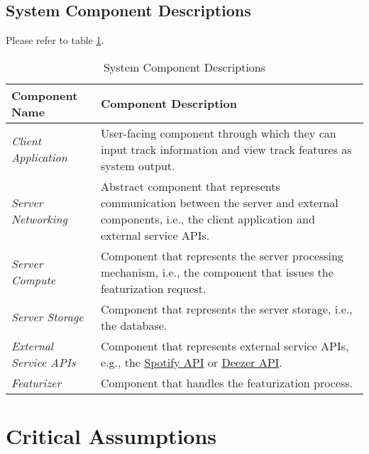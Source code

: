 \documentclass{article}
\begin{document}
\subsection{System Component Descriptions}
Please refer to table \ref{tbl:sys-cmpnt-desc}.
\begin{table}[h!]
    \centering
    \begin{tabular}{ p{.25\linewidth} || p{.65\linewidth} }
      \textbf{Component Name} & \textbf{Component Description} \\
      \toprule
      \emph{Client Application} & User-facing component through which they can input track information and view track features as system output. \\
      \midrule
      \emph{Server Networking} & Abstract component that represents communication between the server and external components, i.e., the client application and external service APIs. \\
      \midrule
      \emph{Server Compute} & Component that represents the server processing mechanism, i.e., the component that issues the featurization request. \\
      \midrule
      \emph{Server Storage} & Component that represents the server storage, i.e., the database. \\
      \midrule
      \emph{External Service APIs} & Component that represents external service APIs, e.g., the \href{https://developer.spotify.com/}{Spotify API} or \href{https://developers.deezer.com/}{Deezer API}. \\
      \midrule
      \emph{Featurizer} & Component that handles the featurization process.
    \end{tabular}
    \label{tbl:sys-cmpnt-desc}
    \caption{System Component Descriptions}
  \end{table}

\newpage
\section{Critical Assumptions}
\end{document}
